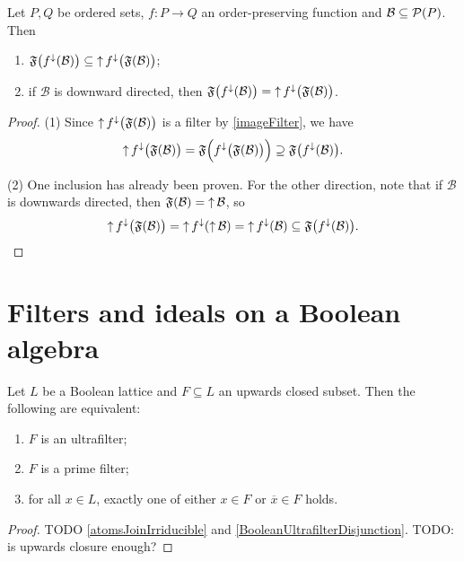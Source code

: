 \begin{proposition} \label{imageFilterSubbasis}
Let $P,Q$ be ordered sets, $f: P\to Q$ an order-preserving function and $\mathcal{B}\subseteq \operatorname{\mathcal{P}}(P)$. Then
\begin{enumerate}
\item $\mathfrak{F}\big(f^{\downarrow}(\mathcal{B})\big) \subseteq \operatorname{\uparrow} f^{\downarrow}\big(\mathfrak{F}(\mathcal{B})\big)$;
\item if $\mathcal{B}$ is downward directed, then $\mathfrak{F}\big(f^{\downarrow}(\mathcal{B})\big) = \operatorname{\uparrow} f^{\downarrow}\big(\mathfrak{F}(\mathcal{B})\big)$.
\end{enumerate}
\end{proposition}
\begin{proof}
(1) Since $\operatorname{\uparrow} f^{\downarrow}\big(\mathfrak{F}(\mathcal{B})\big)$ is a filter by \ref{imageFilter}, we have
\[ \operatorname{\uparrow} f^{\downarrow}\big(\mathfrak{F}(\mathcal{B})\big) = \mathfrak{F}\Big(f^{\downarrow}\big(\mathfrak{F}(\mathcal{B})\big)\Big) \supseteq \mathfrak{F}\big(f^{\downarrow}(\mathcal{B})\big). \]

(2) One inclusion has already been proven. For the other direction, note that if $\mathcal{B}$ is downwards directed, then $\mathfrak{F}(\mathcal{B}) = \operatorname{\uparrow} \mathcal{B}$, so
\[ \operatorname{\uparrow} f^{\downarrow}\big(\mathfrak{F}(\mathcal{B})\big) = \operatorname{\uparrow} f^{\downarrow}(\operatorname{\uparrow}\mathcal{B}) = \operatorname{\uparrow} f^{\downarrow}(\mathcal{B}) \subseteq \mathfrak{F}\big(f^{\downarrow}(\mathcal{B})\big). \]
\end{proof}

\section{Filters and ideals on a Boolean algebra}
\begin{proposition} \label{booleanMaximalFiltersIdeals}
Let $L$ be a Boolean lattice and $F\subseteq L$ an upwards closed subset. Then the following are equivalent:
\begin{enumerate}
\item $F$ is an ultrafilter;
\item $F$ is a prime filter;
\item for all $x\in L$, exactly one of either $x\in F$ or $\overline{x}\in F$ holds.
\end{enumerate}
\end{proposition}
\begin{proof}
TODO \ref{atomsJoinIrriducible} and \ref{BooleanUltrafilterDisjunction}. TODO: is upwards closure enough?
\end{proof}

